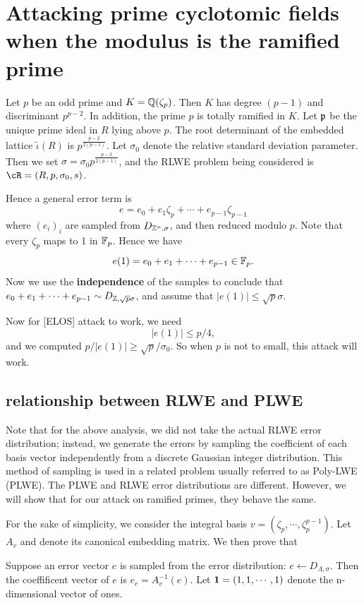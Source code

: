 \documentclass{amsart}
\begin{document}
\section{Attacking prime cyclotomic fields when the modulus is the ramified prime}
\label{sec: ramified-prime}

Let $p$ be an odd prime and $K = \mathbb{Q}(\zeta_p)$. Then $K$ has degree $(p-1)$ and discriminant $p^{p-2}$.
In addition, the prime $p$ is totally ramified in $K$. Let $\mathfrak{p}$ be the unique prime ideal  in $R$ lying above $p$. The root determinant of the embedded lattice $\tilde{\iota}(R)$ is $p^{\frac{p-2}{2(p-1)}}$. Let $\sigma_0$ denote the relative standard deviation parameter. Then we set $\sigma  = \sigma_0 p^{\frac{p-2}{2(p-1)}}$, and the RLWE problem being considered is $\cR = (R, p, \sigma_0, s)$.


Hence a general error term is
\[
    e = e_0 + e_1 \zeta_p + \cdots + e_{p-1} \zeta_{p-1}
\]
where $(e_i)_i$ are sampled from $D_{\mathbb{Z}^n, \sigma}$, and then reduced modulo $p$. Note that every $\zeta_p$ maps to 1 in $\mathbb{F}_p$. Hence we have
\[
    e(1) = e_0 + e_1 + \cdots +e_{p-1} \in \mathbb{F}_p.
\]
Now we use the {\bf independence} of the samples to conclude that $e_0 + e_1 + \cdots +e_{p-1} \sim D_{\mathbb{Z},\sqrt{p}\sigma}$, and assume that $|e(1)| \leq \sqrt{p}\sigma$.

Now for [ELOS] attack to work, we need
\[
    |e(1)| \leq p/4,
\]
and we computed $p/|e(1)| \geq \sqrt{p}/\sigma_0$. So when $p$ is not to small, this attack will work.

\subsection{relationship between RLWE and PLWE}

Note that for the above analysis, we did not take the actual RLWE error distribution; instead, we generate the errors by sampling the coefficient of each basis vector independently
from a discrete Gaussian integer distribution. This method of sampling is used in a related problem usually referred to as Poly-LWE (PLWE). The PLWE and RLWE error distributions are different. However, we will show that for our attack on ramified primes, they behave the same.


For the sake of simplicity, we consider the integral basis  $v = (\zeta_p, \cdots, \zeta_{p}^{p-1})$. Let $A_v$ and  denote its canonical embedding matrix. We then prove that

Suppose an error vector $e$ is sampled from the error distribution: $e \gets D_{\Lambda, \sigma}$.  Then the coeffificent vector of $e$ is $e_c = A_v^{-1}(e)$.
Let ${\bf 1} = (1,1, \cdots,1)$ denote the n-dimensional vector of ones.
\end{document}
